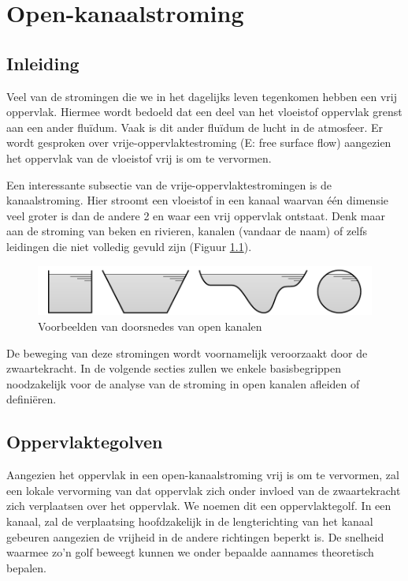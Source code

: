 \chapter{Open-kanaalstroming}
\label{sec:Kanaalstroming}

	\section{Inleiding}
	\label{sec:Kanaalstroming Inleiding}
Veel van de stromingen die we in het dagelijks leven tegenkomen hebben een vrij oppervlak. Hiermee wordt bedoeld dat een deel van het vloeistof oppervlak grenst aan een ander fluïdum. Vaak is dit ander fluïdum de lucht in de atmosfeer. Er wordt gesproken over vrije-oppervlaktestroming (E: free surface flow) aangezien het oppervlak van de vloeistof vrij is om te vervormen.

Een interessante subsectie van de vrije-oppervlaktestromingen is de kanaalstroming. Hier stroomt een vloeistof in een kanaal waarvan één dimensie veel groter is dan de andere 2 en waar een vrij oppervlak ontstaat. Denk maar aan de stroming van beken en rivieren, kanalen (vandaar de naam) of zelfs leidingen die niet volledig gevuld zijn (Figuur \ref{fig:Open_kanaal_doorsnedes}). 
\begin{figure}[htb]
	\centering
	\includegraphics{fig/kanaalstroming/Open_kanaal_doorsnedes}
	\caption{Voorbeelden van doorsnedes van open kanalen}
	\label{fig:Open_kanaal_doorsnedes}
\end{figure}

De beweging van deze stromingen wordt voornamelijk veroorzaakt door de zwaartekracht. In de volgende secties zullen we enkele basisbegrippen noodzakelijk voor de analyse van de stroming in open kanalen afleiden of definiëren.

	\section{Oppervlaktegolven}
	\label{sec:Oppervlaktegolven}
Aangezien het oppervlak in een open-kanaalstroming vrij is om te vervormen, zal een lokale vervorming van dat oppervlak zich onder invloed van de zwaartekracht zich verplaatsen over het oppervlak. We noemen dit een oppervlaktegolf. In een kanaal, zal de verplaatsing hoofdzakelijk in de lengterichting van het kanaal gebeuren aangezien de vrijheid in de andere richtingen beperkt is. De snelheid waarmee zo'n golf beweegt kunnen we onder bepaalde aannames theoretisch bepalen.

